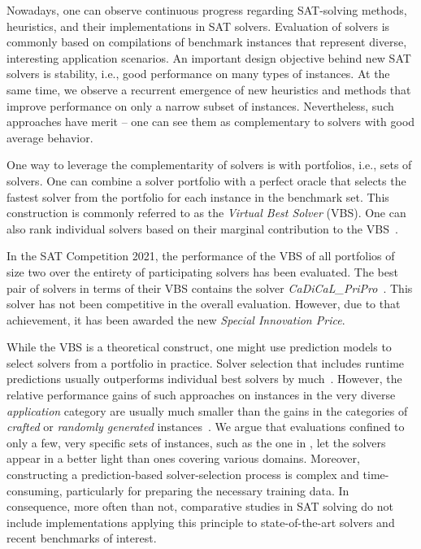 \documentclass[a4paper,USenglish,pdfa]{lipics-v2021} %
\begin{document}
Nowadays, one can observe continuous progress regarding SAT-solving methods, heuristics, and their implementations in SAT solvers. 
Evaluation of solvers is commonly based on compilations of benchmark instances that represent diverse, interesting application scenarios. 
An important design objective behind new SAT solvers is stability, i.e., good performance on many types of instances. 
At the same time, we observe a recurrent emergence of new heuristics and methods that improve performance on only a narrow subset of instances. 
Nevertheless, such approaches have merit -- one can see them as complementary to solvers with good average behavior. 

One way to leverage the complementarity of solvers is with portfolios, i.e., sets of solvers.
One can combine a solver portfolio with a perfect oracle that selects the fastest solver from the portfolio for each instance in the benchmark set. 
This construction is commonly referred to as the \emph{Virtual Best Solver} (VBS). 
One can also rank individual solvers based on their marginal contribution to the VBS~\cite{Xu:2012:EvalContribVBS}. 

\begin{example}
\label{ex:specialprice}
In the SAT Competition 2021, the performance of the VBS of all portfolios of size two over the entirety of participating solvers has been evaluated. 
The best pair of solvers in terms of their VBS contains the solver \emph{CaDiCaL\_PriPro}~\cite{balyo2021proceedings}.
This solver has not been competitive in the overall evaluation.
However, due to that achievement, it has been awarded the new \emph{Special Innovation Price}.
\end{example}

While the VBS is a theoretical construct, one might use prediction models to select solvers from a portfolio in practice.
Solver selection that includes runtime predictions usually outperforms individual best solvers by much~\cite{xu2008satzilla}. 
However, the relative performance gains of such approaches on instances in the very diverse \emph{application} category are usually much smaller than the gains in the categories of \emph{crafted} or \emph{randomly generated} instances~\cite{Xu:2012:EvalContribVBS,Collautti:2013:SNNAP}. 
We argue that evaluations confined to only a few, very specific sets of instances, such as the one in \cite{Kadioglu:2010:ISAC}, let the solvers appear in a better light than ones covering various domains. 
Moreover, constructing a prediction-based solver-selection process is complex and time-consuming, particularly for preparing the necessary training data.
In consequence, more often than not, comparative studies in SAT solving do not include implementations applying this principle to state-of-the-art solvers and recent benchmarks of interest.
\end{document}
